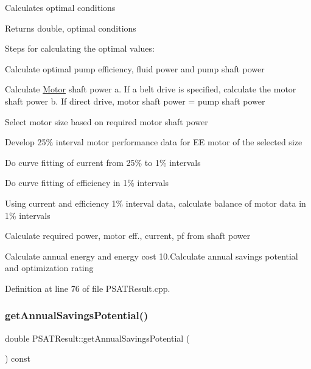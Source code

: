 Calculates optimal conditions \begin{DoxyReturn}{Returns}
double, optimal conditions 
\end{DoxyReturn}
Steps for calculating the optimal values\+:
\begin{DoxyEnumerate}
\item Calculate optimal pump efficiency, fluid power and pump shaft power
\item Calculate \hyperlink{class_motor}{Motor} shaft power a. If a belt drive is specified, calculate the motor shaft power b. If direct drive, motor shaft power = pump shaft power
\item Select motor size based on required motor shaft power
\item Develop 25\% interval motor performance data for EE motor of the selected size
\item Do curve fitting of current from 25\% to 1\% intervals
\item Do curve fitting of efficiency in 1\% intervals
\item Using current and efficiency 1\% interval data, calculate balance of motor data in 1\% intervals
\item Calculate required power, motor eff., current, pf from shaft power
\item Calculate annual energy and energy cost 10.\+Calculate annual savings potential and optimization rating
\end{DoxyEnumerate}

Definition at line 76 of file P\+S\+A\+T\+Result.\+cpp.

\mbox{\label{class_p_s_a_t_result_a14fc75c2e0e92f74e3df1b97ed13b496}} 
\subsubsection{\texorpdfstring{get\+Annual\+Savings\+Potential()}{getAnnualSavingsPotential()}}
{\footnotesize\ttfamily double P\+S\+A\+T\+Result\+::get\+Annual\+Savings\+Potential (\begin{DoxyParamCaption}{ }\end{DoxyParamCaption}) const\hspace{0.3cm}{\ttfamily [inline]}}


